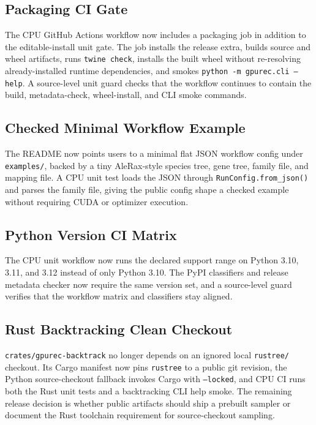 \documentclass[11pt]{article}
\begin{document}
\subsection{Packaging CI Gate}

The CPU GitHub Actions workflow now includes a packaging job in addition to the
editable-install unit gate.  The job installs the release extra, builds source
and wheel artifacts, runs \texttt{twine check}, installs the built wheel without
re-resolving already-installed runtime dependencies, and smokes
\texttt{python -m gpurec.cli --help}.  A source-level unit guard checks that the
workflow continues to contain the build, metadata-check, wheel-install, and CLI
smoke commands.

\subsection{Checked Minimal Workflow Example}

The README now points users to a minimal flat JSON workflow config under
\texttt{examples/}, backed by a tiny AleRax-style species tree, gene tree,
family file, and mapping file.  A CPU unit test loads the JSON through
\texttt{RunConfig.from\_json()} and parses the family file, giving the public
config shape a checked example without requiring CUDA or optimizer execution.

\subsection{Python Version CI Matrix}

The CPU unit workflow now runs the declared support range on Python 3.10, 3.11,
and 3.12 instead of only Python 3.10.  The PyPI classifiers and release metadata
checker now require the same version set, and a source-level guard verifies that
the workflow matrix and classifiers stay aligned.

\subsection{Rust Backtracking Clean Checkout}

\texttt{crates/gpurec-backtrack} no longer depends on an ignored local
\texttt{rustree/} checkout.  Its Cargo manifest now pins \texttt{rustree} to a
public git revision, the Python source-checkout fallback invokes Cargo with
\texttt{--locked}, and CPU CI runs both the Rust unit tests and a backtracking
CLI help smoke.  The remaining release decision is whether public artifacts
should ship a prebuilt sampler or document the Rust toolchain requirement for
source-checkout sampling.
\end{document}
